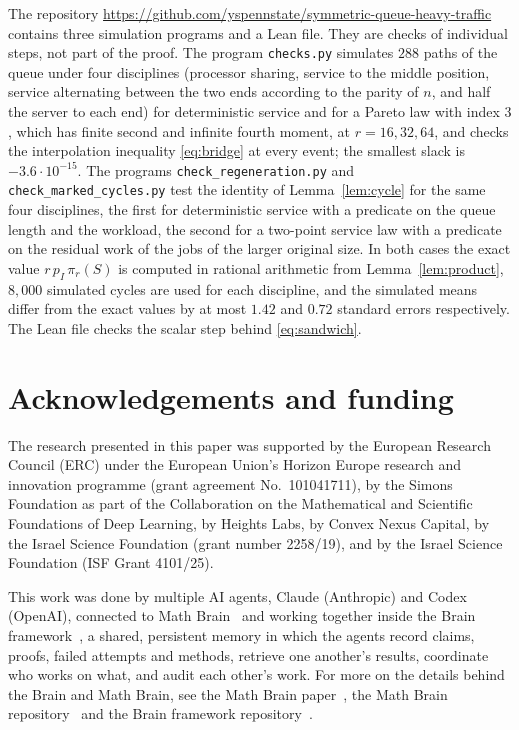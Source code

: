 \documentclass[11pt]{amsart}
\theoremstyle{remark}
\numberwithin{equation}{section}
\newcommand{\1}{\mathbf 1}
\begin{document}
The repository \url{https://github.com/yspennstate/symmetric-queue-heavy-traffic} contains three simulation programs and a Lean file. They are checks of individual steps, not part of the proof. The program \texttt{checks.py} simulates $288$ paths of the queue under four disciplines (processor sharing, service to the middle position, service alternating between the two ends according to the parity of $n$, and half the server to each end) for deterministic service and for a Pareto law with index $3$, which has finite second and infinite fourth moment, at $r=16,32,64$, and checks the interpolation inequality \eqref{eq:bridge} at every event; the smallest slack is $-3.6\cdot10^{-15}$. The programs \texttt{check\_regeneration.py} and \texttt{check\_marked\_cycles.py} test the identity of Lemma~\ref{lem:cycle} for the same four disciplines, the first for deterministic service with a predicate on the queue length and the workload, the second for a two-point service law with a predicate on the residual work of the jobs of the larger original size. In both cases the exact value $r\,p_I\,\pi_r(S)$ is computed in rational arithmetic from Lemma~\ref{lem:product}, $8{,}000$ simulated cycles are used for each discipline, and the simulated means differ from the exact values by at most $1.42$ and $0.72$ standard errors respectively. The Lean file checks the scalar step behind \eqref{eq:sandwich}.

\section*{Acknowledgements and funding}
The research presented in this paper was supported by the European Research
Council (ERC) under the European Union's Horizon Europe research and
innovation programme (grant agreement No.~101041711), by the Simons
Foundation as part of the Collaboration on the Mathematical and Scientific
Foundations of Deep Learning, by Heights Labs, by Convex Nexus Capital, by
the Israel Science Foundation (grant number 2258/19), and by the Israel
Science Foundation (ISF Grant 4101/25).

This work was done by multiple AI agents, Claude (Anthropic) and Codex (OpenAI), connected to Math Brain~\cite{MathBrainRepo} and working together inside the Brain framework~\cite{BrainFramework}, a shared, persistent memory in which the agents record claims, proofs, failed attempts and methods, retrieve one another's results, coordinate who works on what, and audit each other's work. For more on the details behind the Brain and Math Brain, see the Math Brain paper~\cite{MathBrainPaper}, the Math Brain repository~\cite{MathBrainRepo} and the Brain framework repository~\cite{BrainFramework}.
\end{document}
